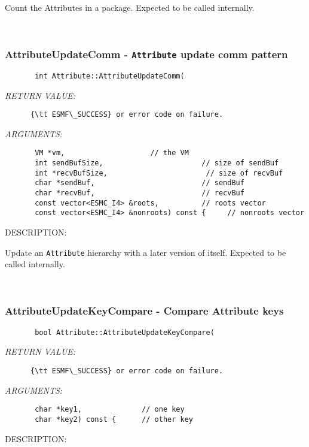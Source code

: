       Count the Attributes in a package.  
      Expected to be called internally.
   
 
\mbox{}\hrulefill\
 
\subsubsection [AttributeUpdateComm] {AttributeUpdateComm - {\tt Attribute} update comm pattern}


  
\begin{verbatim}       int Attribute::AttributeUpdateComm(\end{verbatim}{\em RETURN VALUE:}
\begin{verbatim}      {\tt ESMF\_SUCCESS} or error code on failure.\end{verbatim}{\em ARGUMENTS:}
\begin{verbatim}       VM *vm,                    // the VM
       int sendBufSize,                       // size of sendBuf
       int *recvBufSize,                       // size of recvBuf
       char *sendBuf,                         // sendBuf
       char *recvBuf,                         // recvBuf
       const vector<ESMC_I4> &roots,          // roots vector
       const vector<ESMC_I4> &nonroots) const {     // nonroots vector\end{verbatim}
{\sf DESCRIPTION:\\ }


      Update an {\tt Attribute} hierarchy with a later version of itself.  
      Expected to be called internally.
   
 
\mbox{}\hrulefill\
 
\subsubsection [AttributeUpdateKeyCompare] {AttributeUpdateKeyCompare - Compare Attribute keys}


  
\begin{verbatim}       bool Attribute::AttributeUpdateKeyCompare(\end{verbatim}{\em RETURN VALUE:}
\begin{verbatim}      {\tt ESMF\_SUCCESS} or error code on failure.\end{verbatim}{\em ARGUMENTS:}
\begin{verbatim}       char *key1,              // one key
       char *key2) const {      // other key\end{verbatim}
{\sf DESCRIPTION:\\ }


